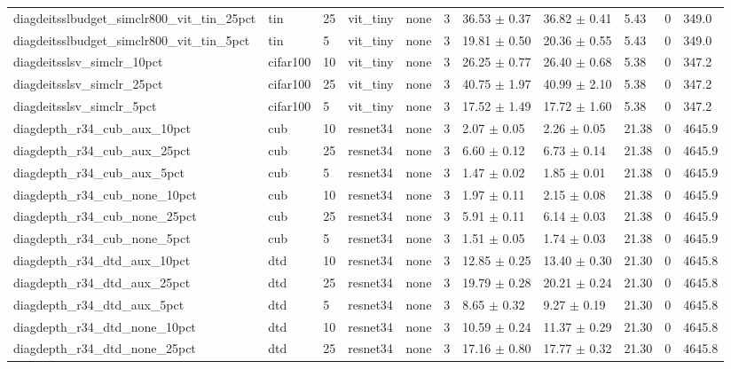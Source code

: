 \begin{tabular}{lllllllllll}
diagdeitsslbudget_simclr800_vit_tin_25pct & tin & 25 & vit_tiny & none & 3 & 36.53 $\pm$ 0.37 & 36.82 $\pm$ 0.41 & 5.43 & 0 & 349.0 \\
diagdeitsslbudget_simclr800_vit_tin_5pct & tin & 5 & vit_tiny & none & 3 & 19.81 $\pm$ 0.50 & 20.36 $\pm$ 0.55 & 5.43 & 0 & 349.0 \\
diagdeitsslsv_simclr_10pct & cifar100 & 10 & vit_tiny & none & 3 & 26.25 $\pm$ 0.77 & 26.40 $\pm$ 0.68 & 5.38 & 0 & 347.2 \\
diagdeitsslsv_simclr_25pct & cifar100 & 25 & vit_tiny & none & 3 & 40.75 $\pm$ 1.97 & 40.99 $\pm$ 2.10 & 5.38 & 0 & 347.2 \\
diagdeitsslsv_simclr_5pct & cifar100 & 5 & vit_tiny & none & 3 & 17.52 $\pm$ 1.49 & 17.72 $\pm$ 1.60 & 5.38 & 0 & 347.2 \\
diagdepth_r34_cub_aux_10pct & cub & 10 & resnet34 & none & 3 & 2.07 $\pm$ 0.05 & 2.26 $\pm$ 0.05 & 21.38 & 0 & 4645.9 \\
diagdepth_r34_cub_aux_25pct & cub & 25 & resnet34 & none & 3 & 6.60 $\pm$ 0.12 & 6.73 $\pm$ 0.14 & 21.38 & 0 & 4645.9 \\
diagdepth_r34_cub_aux_5pct & cub & 5 & resnet34 & none & 3 & 1.47 $\pm$ 0.02 & 1.85 $\pm$ 0.01 & 21.38 & 0 & 4645.9 \\
diagdepth_r34_cub_none_10pct & cub & 10 & resnet34 & none & 3 & 1.97 $\pm$ 0.11 & 2.15 $\pm$ 0.08 & 21.38 & 0 & 4645.9 \\
diagdepth_r34_cub_none_25pct & cub & 25 & resnet34 & none & 3 & 5.91 $\pm$ 0.11 & 6.14 $\pm$ 0.03 & 21.38 & 0 & 4645.9 \\
diagdepth_r34_cub_none_5pct & cub & 5 & resnet34 & none & 3 & 1.51 $\pm$ 0.05 & 1.74 $\pm$ 0.03 & 21.38 & 0 & 4645.9 \\
diagdepth_r34_dtd_aux_10pct & dtd & 10 & resnet34 & none & 3 & 12.85 $\pm$ 0.25 & 13.40 $\pm$ 0.30 & 21.30 & 0 & 4645.8 \\
diagdepth_r34_dtd_aux_25pct & dtd & 25 & resnet34 & none & 3 & 19.79 $\pm$ 0.28 & 20.21 $\pm$ 0.24 & 21.30 & 0 & 4645.8 \\
diagdepth_r34_dtd_aux_5pct & dtd & 5 & resnet34 & none & 3 & 8.65 $\pm$ 0.32 & 9.27 $\pm$ 0.19 & 21.30 & 0 & 4645.8 \\
diagdepth_r34_dtd_none_10pct & dtd & 10 & resnet34 & none & 3 & 10.59 $\pm$ 0.24 & 11.37 $\pm$ 0.29 & 21.30 & 0 & 4645.8 \\
diagdepth_r34_dtd_none_25pct & dtd & 25 & resnet34 & none & 3 & 17.16 $\pm$ 0.80 & 17.77 $\pm$ 0.32 & 21.30 & 0 & 4645.8 \\

\end{tabular}
